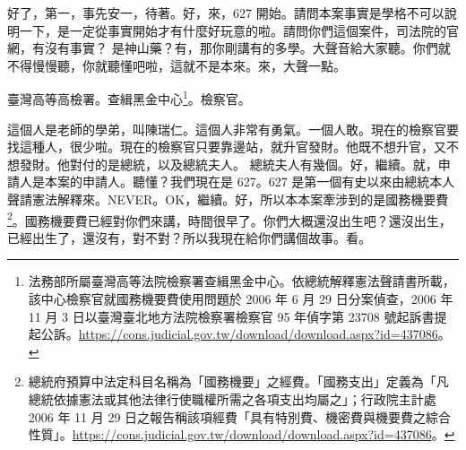 \hypertarget{c11:cue:10}{}好了，第一，事先安一，待著。好，來，627 開始。請問本案事實是學格不可以說明一下，是一定從事實開始才有什麼好玩意的啦。請問你們這個案件，司法院的官網，有沒有事實？
\hypertarget{c11:cue:11}{}是神山藥？有，那你剛講有的多學。大聲音給大家聽。你們就不得慢慢聽，你就聽懂吧啦，這就不是本來。來，大聲一點。\par{}臺灣高等高檢署。查緝黑金中心\footnote{法務部所屬臺灣高等法院檢察署查緝黑金中心。依總統解釋憲法聲請書所載，該中心檢察官就國務機要費使用問題於 2006 年 6 月 29 日分案偵查，2006 年 11 月 3 日以臺灣臺北地方法院檢察署檢察官 95 年偵字第 23708 號起訴書提起公訴。\url{https://cons.judicial.gov.tw/download/download.aspx?id=437086}。}。檢察官。\par{}這個人是老師的學弟，叫陳瑞仁。這個人非常有勇氣。一個人敢。現在的檢察官要找這種人，很少啦。現在的檢察官只要靠邊站，就升官發財。他既不想升官，又不想發財。他對付的是總統，以及總統夫人。
\hypertarget{c11:cue:12}{}總統夫人有幾個。好，繼續。就，申請人是本案的申請人。聽懂？我們現在是 627。627 是第一個有史以來由總統本人聲請憲法解釋來。NEVER。OK，繼續。好，所以本本案牽涉到的是國務機要費\footnote{總統府預算中法定科目名稱為「國務機要」之經費。「國務支出」定義為「凡總統依據憲法或其他法律行使職權所需之各項支出均屬之」；行政院主計處 2006 年 11 月 29 日之報告稱該項經費「具有特別費、機密費與機要費之綜合性質」。\url{https://cons.judicial.gov.tw/download/download.aspx?id=437086}。}。國務機要費已經對你們來講，時間很早了。你們大概還沒出生吧？還沒出生，已經出生了，還沒有，對不對？所以我現在給你們講個故事。看。

